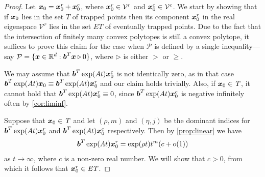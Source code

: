 \begin{proof}

  Let
  $\boldsymbol{x}_{0}=\boldsymbol{x}_{0}^{r}+\boldsymbol{x}_{0}^{c}$,
  where $\boldsymbol{x}_{0}^{r}\in \mathcal{V}^{r}$ and
  $\boldsymbol{x}_{0}^{c}\in \mathcal{V}^{c}$. We start by showing
  that if $\boldsymbol{x}_{0}$ lies in the set $T$ of trapped points
  then its component $\boldsymbol{x}_{0}^{r}$ in the real eigenspace
  $\mathcal{V}^{r}$ lies in the set $\mathit{ET}$ of eventually
  trapped points.
Due to the
fact that the intersection of finitely many convex polytopes is still
a convex polytope, it suffices to prove this claim for the case when
  $\mathcal{P}$ is defined by a single inequality---say
  $\mathcal{P}=\lbrace \boldsymbol{x}\in\mathbb{R}^{d}:
  \boldsymbol{b}^{T}\boldsymbol{x}\triangleright 0\rbrace$, where
  $\triangleright$ is either $>$ or $\geq$.

  We may assume that
  $\boldsymbol{b}^{T} \exp(At) \boldsymbol{x}_{0}^{c}$ is not identically
  zero, as in that case
  $\boldsymbol{b}^{T} \exp(At)\boldsymbol{x}_{0} \equiv
  \boldsymbol{b}^{T} \exp(At)\boldsymbol{x}_{0}^{r}$ and our claim
  holds trivially.
  Also, if $\boldsymbol{x}_{0}\in\mathit{T}$, it cannot hold that
  $\boldsymbol{b}^{T} \exp(At) \boldsymbol{x}_{0}^{r} \equiv 0$, since
  $\boldsymbol{b}^{T} \exp(At) \boldsymbol{x}_{0}^{c}$ is negative
  infinitely often by \cref{cor:liminf}.

  Suppose that $\boldsymbol{x}_{0}\in\mathit{T}$ and let $(\rho,m)$
  and $(\eta,j)$ be the dominant indices for
  $\boldsymbol{b}^{T} \exp(At) \boldsymbol{x}_{0}^{r}$ and
  $\boldsymbol{b}^{T} \exp(At) \boldsymbol{x}_{0}^{c}$ respectively.
Then by \cref{prop:linear} we have
\begin{gather}
\myvector{b}^{T} \exp(At) \myvector{x}_{0}^{r} = \exp(\rho t)t^m (c
  + o(1))
\label{eq:real}
\end{gather}
 as $t \rightarrow \infty$, where $c$ is a non-zero real
number.  We will show that $c>0$, from which it follows  that
$\boldsymbol{x}_{0}^{r} \in \mathit{ET}$.


\end{proof}
